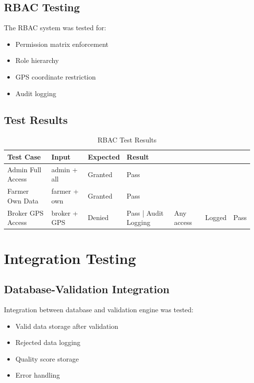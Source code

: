 \subsection{RBAC Testing}

The RBAC system was tested for:

\begin{itemize}
    \item Permission matrix enforcement
    \item Role hierarchy
    \item GPS coordinate restriction
    \item Audit logging
\end{itemize}

\subsection{Test Results}

\begin{table}[H]
\centering
\begin{tabular}{|l|l|l|l|}
\hline
\textbf{Test Case} & \textbf{Input} & \textbf{Expected} & \textbf{Result} \\
\hline
Admin Full Access & admin + all & Granted & Pass \\
Farmer Own Data & farmer + own & Granted & Pass \\
Broker GPS Access & broker + GPS & Denied & Pass |
Audit Logging & Any access & Logged & Pass \\
\hline
\end{tabular}
\caption{RBAC Test Results}
\end{table}

\section{Integration Testing}

\subsection{Database-Validation Integration}

Integration between database and validation engine was tested:

\begin{itemize}
    \item Valid data storage after validation
    \item Rejected data logging
    \item Quality score storage
    \item Error handling
\end{itemize}

